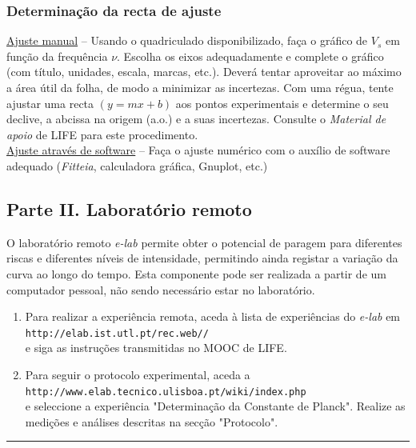 \documentclass[a4paper,twoside,11pt]{report}      %
\newcommand{\HRule}{\rule{\linewidth}{0.5mm}}
\begin{document}
\subsubsection*{\sf Determinação da recta de ajuste}
\underline{Ajuste manual} -- Usando o quadriculado disponibilizado, faça o gráfico de $V_s$ em função da frequência $\nu$. Escolha os eixos adequadamente e complete o gráfico (com título, unidades, escala, marcas, etc.). Deverá tentar aproveitar ao máximo a área útil da folha, de modo a minimizar as incertezas. Com uma régua, tente ajustar uma recta $(y=mx + b)$ aos pontos experimentais e determine o seu declive, a  abcissa na origem (a.o.) e a suas incertezas. Consulte o \emph{Material de apoio} de LIFE para este procedimento.\\
\underline{Ajuste através de software} -- Faça o ajuste numérico com o auxílio de software adequado (\emph{Fitteia}, calculadora gráfica, Gnuplot, etc.) 


\subsection*{\sf Parte II. Laboratório remoto}
O laboratório remoto \emph{e-lab} permite obter o potencial de paragem para diferentes riscas e diferentes níveis de intensidade, permitindo ainda registar a variação da curva ao longo do tempo. Esta componente pode ser realizada a partir de um computador pessoal, não sendo necessário estar no laboratório.\\

\begin{enumerate}
\item Para realizar a experiência remota,  aceda à lista de experiências do \emph{e-lab} em\\
\texttt{http://elab.ist.utl.pt/rec.web//}\\
e siga as instruções transmitidas no MOOC de LIFE.
\item Para seguir o protocolo experimental, aceda a\\ 
\texttt{http://www.elab.tecnico.ulisboa.pt/wiki/index.php}\\
e seleccione a experiência "Determinação da Constante de Planck". Realize as medições e análises descritas na secção "Protocolo".
\end{enumerate}
\HRule

	
\newpage
\def\width{15}
\def\hauteur{25}
\end{document}
